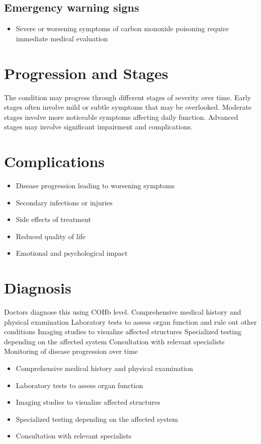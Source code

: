 \subsection{Emergency warning signs}
\begin{itemize}[noitemsep]
  \item Severe or worsening symptoms of carbon monoxide poisoning require immediate medical evaluation
\end{itemize}
\section{Progression and Stages}
The condition may progress through different stages of severity over time. Early stages often involve mild or subtle symptoms that may be overlooked. Moderate stages involve more noticeable symptoms affecting daily function. Advanced stages may involve significant impairment and complications.
\section{Complications}
\begin{itemize}[noitemsep]
  \item Disease progression leading to worsening symptoms
  \item Secondary infections or injuries
  \item Side effects of treatment
  \item Reduced quality of life
  \item Emotional and psychological impact
\end{itemize}
\section{Diagnosis}
Doctors diagnose this using COHb level. Comprehensive medical history and physical examination Laboratory tests to assess organ function and rule out other conditions Imaging studies to visualize affected structures Specialized testing depending on the affected system Consultation with relevant specialists Monitoring of disease progression over time

\begin{itemize}[noitemsep]
  \item Comprehensive medical history and physical examination
  \item Laboratory tests to assess organ function
  \item Imaging studies to visualize affected structures
  \item Specialized testing depending on the affected system
  \item Consultation with relevant specialists
\end{itemize}
